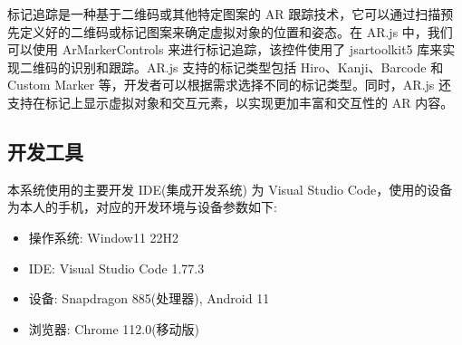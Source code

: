 标记追踪是一种基于二维码或其他特定图案的 AR 跟踪技术，它可以通过扫描预先定义好的二维码或标记图案来确定虚拟对象的位置和姿态。在 AR.js 中，我们可以使用 ArMarkerControls 来进行标记追踪，该控件使用了 jsartoolkit5 库来实现二维码的识别和跟踪。AR.js 支持的标记类型包括 Hiro、Kanji、Barcode 和 Custom Marker 等，开发者可以根据需求选择不同的标记类型\cite{cheng2017comparison}。同时，AR.js 还支持在标记上显示虚拟对象和交互元素，以实现更加丰富和交互性的 AR 内容。

\subsection{开发工具}

本系统使用的主要开发 IDE(集成开发系统) 为 Visual Studio Code，使用的设备为本人的手机，对应的开发环境与设备参数如下:
\begin{itemize}
  \item 操作系统: Window11 22H2
  \item IDE: Visual Studio Code 1.77.3
  \item 设备: Snapdragon 885(处理器), Android 11
  \item 浏览器: Chrome 112.0(移动版)
\end{itemize}